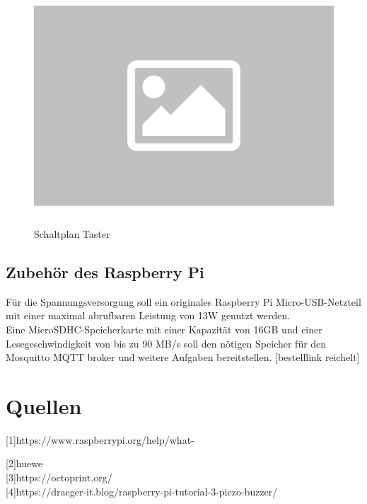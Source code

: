 \documentclass[12pt,a4paper,openany]{scrbook}
\begin{document}
	\begin{figure}[H]
	\centering
	\includegraphics[height=250pt]{img/platzhalter}
	\caption{Schaltplan Taster}
	\label{Bildlabel}
\end{figure}

\section{Zubehör des Raspberry Pi}

Für die Spannungsversorgung soll ein originales Raspberry Pi Micro-USB-Netzteil mit einer maximal abrufbaren Leistung von 13W genutzt werden.\\[0,5cm]

Eine MicroSDHC-Speicherkarte mit einer Kapazität von 16GB und einer Lesegeschwindigkeit von bis zu 90 MB/s soll den nötigen Speicher für den Mosquitto MQTT broker und weitere Aufgaben bereitstellen. [bestelllink reichelt] 


\vspace{1cm}
\centering

\chapter{Quellen}
[1]https://www.raspberrypi.org/help/what-%

[2]huewe\\ 

[3]https://octoprint.org/\\ 

[4]https://draeger-it.blog/raspberry-pi-tutorial-3-piezo-buzzer/
\end{document}
